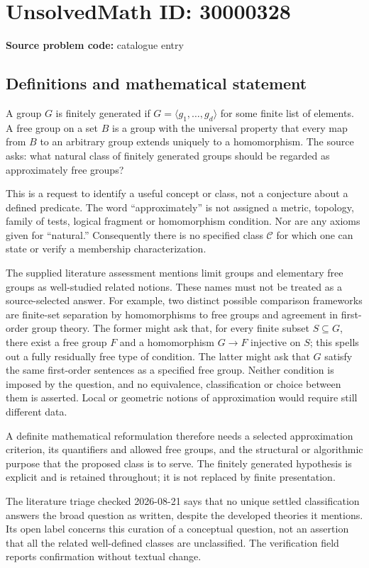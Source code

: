 \documentclass[11pt]{article}
\begin{document}
\section*{UnsolvedMath ID: 30000328}
\textbf{Source problem code:} catalogue entry
\subsection{Definitions and mathematical statement}
A group \(G\) is finitely generated if \(G=\langle g_1,\ldots,g_d\rangle\) for some finite list of elements. A free group on a set \(B\) is a group with the universal property that every map from \(B\) to an arbitrary group extends uniquely to a homomorphism. The source asks: what natural class of finitely generated groups should be regarded as approximately free groups?

This is a request to identify a useful concept or class, not a conjecture about a defined predicate. The word ``approximately'' is not assigned a metric, topology, family of tests, logical fragment or homomorphism condition. Nor are any axioms given for ``natural.'' Consequently there is no specified class \(\mathcal C\) for which one can state or verify a membership characterization.

The supplied literature assessment mentions limit groups and elementary free groups as well-studied related notions. These names must not be treated as a source-selected answer. For example, two distinct possible comparison frameworks are finite-set separation by homomorphisms to free groups and agreement in first-order group theory. The former might ask that, for every finite subset \(S\subseteq G\), there exist a free group \(F\) and a homomorphism \(G\to F\) injective on \(S\); this spells out a fully residually free type of condition. The latter might ask that \(G\) satisfy the same first-order sentences as a specified free group. Neither condition is imposed by the question, and no equivalence, classification or choice between them is asserted. Local or geometric notions of approximation would require still different data.

A definite mathematical reformulation therefore needs a selected approximation criterion, its quantifiers and allowed free groups, and the structural or algorithmic purpose that the proposed class is to serve. The finitely generated hypothesis is explicit and is retained throughout; it is not replaced by finite presentation.

The literature triage checked 2026-08-21 says that no unique settled classification answers the broad question as written, despite the developed theories it mentions. Its open label concerns this curation of a conceptual question, not an assertion that all the related well-defined classes are unclassified. The verification field reports confirmation without textual change.
\end{document}
